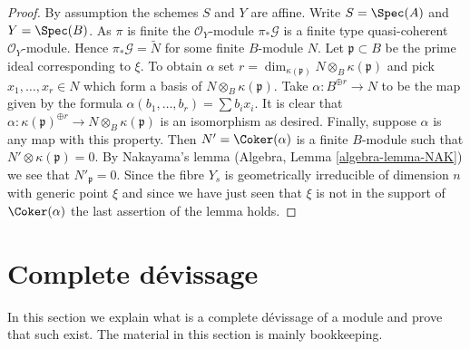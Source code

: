 \begin{proof}
By assumption the schemes $S$ and $Y$ are affine.
Write $S = \Spec(A)$ and $Y = \Spec(B)$.
As $\pi$ is finite the $\mathcal{O}_Y$-module $\pi_*\mathcal{G}$
is a finite type quasi-coherent $\mathcal{O}_Y$-module.
Hence $\pi_*\mathcal{G} = \widetilde{N}$ for some finite $B$-module $N$.
Let $\mathfrak p \subset B$ be the prime ideal corresponding to $\xi$.
To obtain $\alpha$ set
$r = \dim_{\kappa(\mathfrak p)} N \otimes_B \kappa(\mathfrak p)$
and pick $x_1, \ldots, x_r \in N$ which form a basis of
$N \otimes_B \kappa(\mathfrak p)$. Take $\alpha : B^{\oplus r} \to N$
to be the map given by the formula $\alpha(b_1, \ldots, b_r) = \sum b_ix_i$.
It is clear that
$\alpha : \kappa(\mathfrak p)^{\oplus r} \to N \otimes_B \kappa(\mathfrak p)$
is an isomorphism as desired. Finally, suppose $\alpha$ is any map with this
property. Then $N' = \Coker(\alpha)$ is a finite $B$-module
such that $N' \otimes \kappa(\mathfrak p) = 0$. By Nakayama's lemma
(Algebra, Lemma \ref{algebra-lemma-NAK})
we see that $N'_{\mathfrak p} = 0$. Since the fibre $Y_s$ is
geometrically irreducible of dimension $n$ with generic point $\xi$
and since we have just seen that $\xi$ is not in the support of
$\Coker(\alpha)$ the last assertion of the lemma holds.
\end{proof}


\section{Complete d\'evissage}
\label{section-complete-devissage}

\noindent
In this section we explain what is a complete d\'evissage of a
module and prove that such exist. The material in this
section is mainly bookkeeping.

